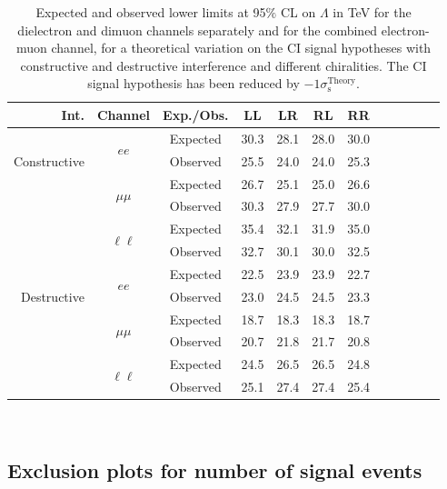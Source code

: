 \begin{table}[htp]
\begin{center}
\caption{Expected and observed lower limits at 95$\%$ CL on $\Lambda$ in TeV for the dielectron and dimuon channels separately
and for the combined electron-muon channel, for a theoretical variation on the CI signal hypotheses with
constructive and destructive interference and different chiralities.
The CI signal hypothesis has been reduced by $-1\sigma_\text{s}^\text{Theory}$.}
{\begin{tabular}{r c c c c c c c c c c c}\toprule
Int. & Channel & Exp./Obs. & LL & LR & RL & RR \\
\midrule
\multirow{3}{*}[-1.5em]{\begin{sideways}Constructive\end{sideways}} & \multirow{2}{*}{$ee$} & Expected & 30.3 & 28.1 & 28.0 & 30.0 \\
& & Observed & 25.5 & 24.0 & 24.0 & 25.3 \\
\cmidrule{2-7}
 & \multirow{2}{*}{$\mu\mu$} & Expected & 26.7 & 25.1 & 25.0 & 26.6 \\
& & Observed & 30.3 & 27.9 & 27.7 & 30.0 \\
\cmidrule{2-7}
 & \multirow{2}{*}{$\ell\ell$} & Expected & 35.4 & 32.1 & 31.9 & 35.0 \\
& & Observed & 32.7 & 30.1 & 30.0 & 32.5 \\
\midrule
\multirow{3}{*}[-1.5em]{\begin{sideways}Destructive\end{sideways}} & \multirow{2}{*}{$ee$} & Expected & 22.5 & 23.9 & 23.9 & 22.7 \\
& & Observed & 23.0 & 24.5 & 24.5 & 23.3 \\
\cmidrule{2-7}
 & \multirow{2}{*}{$\mu\mu$} & Expected & 18.7 & 18.3 & 18.3 & 18.7 \\
& & Observed & 20.7 & 21.8 & 21.7 & 20.8 \\
\cmidrule{2-7}
 & \multirow{2}{*}{$\ell\ell$} & Expected & 24.5 & 26.5 & 26.5 & 24.8 \\
& & Observed & 25.1 & 27.4 & 27.4 & 25.4 \\
\bottomrule\end{tabular}} \\
\label{tab:limits_on_lambda_theoryDn}
\end{center}
\end{table}

\clearpage

\subsection{Exclusion plots for number of signal events}

